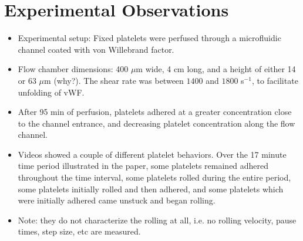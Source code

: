 \documentclass[
10pt, %
letterpaper, %
twocolumn, %
landscape %
]{article}
\begin{document}
\pagestyle{myheadings} %
\markright{\doctitle} %


\thispagestyle{plain} %

\printtitle %




\section{Experimental Observations}

\begin{itemize}
\item Experimental setup: Fixed platelets were perfused through a
  microfluidic channel coated with von Willebrand factor.
\item Flow chamber dimensions: 400 $\mu$m wide, 4 cm long, and a
  height of either 14 or 63 $\mu$m (why?). The shear rate was between
  $1400$ and $1800$ s$^{-1}$, to facilitate unfolding of vWF.
\item After 95 min of perfusion, platelets adhered at a greater
  concentration close to the channel entrance, and decreasing platelet
  concentration along the flow channel. 
\item Videos showed a couple of different platelet behaviors. Over the
  17 minute time period illustrated in the paper, some platelets
  remained adhered throughout the time interval, some platelets rolled
  during the entire period, some platelets initially rolled and then
  adhered, and some platelets which were initially adhered came
  unstuck and began rolling. 
\item Note: they do not characterize the rolling at all, i.e. no
  rolling velocity, pause times, step size, etc are measured.
\end{itemize}
\end{document}

